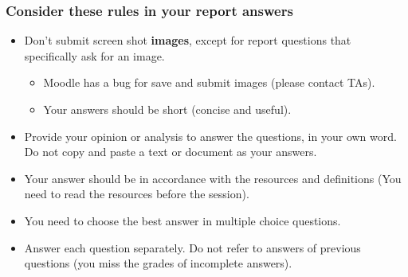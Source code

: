 \documentclass[aspectratio=169,15pt]{beamer}
\begin{document}
\begin{frame}
    \frametitle{Consider these rules in your report answers}

    \begin{itemize}
        \item Don’t submit screen shot \textbf{images}, except for report questions that specifically ask for an image.
        \begin{itemize}
            \item Moodle has a bug for save and submit images (please contact TAs).
            \item Your answers should be short (concise and useful).
        \end{itemize}
        \item Provide your opinion or analysis to answer the questions, in your own word. Do not copy and paste a text or document as your answers.
        \item Your answer should be in accordance with the resources and definitions (You need to read the resources before the session).
        \item You need to choose the best answer in multiple choice questions.
        \item Answer each question separately. Do not refer to answers of previous questions  (you miss the grades of incomplete answers).
    \end{itemize}

\end{frame}
\end{document}
